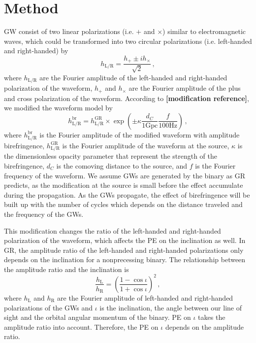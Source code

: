 \documentclass[reprint,amsmath,amssymb,aps,twocolumn]{aastex631}
\begin{document}
\section{Method}
\label{sec:Method}
GW consist of two linear polarizations (i.e. $+$ and $\times$) similar to electromagnetic waves, which could be transformed into two circular polarizations (i.e. left-handed and right-handed) by
\begin{equation}
    h_{\mathrm{L/R}} = \frac{h_+ \pm i h_\times}{\sqrt{2}}\,,
\end{equation}
where $h_{\mathrm{L/R}}$ are the Fourier amplitude of the left-handed and right-handed polarization of the waveform, $h_+$ and $h_\times$ are the Fourier amplitude of the plus and cross polarization of the waveform.
According to \textbf{[modification reference]}, we modified the waveform model by
\begin{equation}
    h_\mathrm{L/R}^{\mathrm{br}}=
    h_\mathrm{L/R}^{\mathrm{GR}}\times
    \exp\left(\pm\kappa\frac{d_C}{1\mathrm{Gpc}}\frac{f}{100\mathrm{Hz}}\right)\,,
\end{equation}
where $h_\mathrm{L/R}^{\mathrm{br}}$ is the Fourier amplitude of the modified waveform with amplitude birefringence, $h_\mathrm{L/R}^{\mathrm{GR}}$ is the Fourier amplitude of the waveform at the source, $\kappa$ is the dimensionless opacity parameter that represent the strength of the birefringence, $d_C$ is the comoving distance to the source, and $f$ is the Fourier frequency of the waveform.
We assume GWs are generated by the binary as GR predicts, as the modification at the source is small before the effect accumulate during the propagation.
As the GWs propagate, the effect of birefringence will be built up with the number of cycles which depends on the distance traveled and the frequency of the GWs.

This modification changes the ratio of the left-handed and right-handed polarization of the waveform, which affects the PE on the inclination as well.
In GR, the amplitude ratio of the left-handed and right-handed polarizations only depends on the inclination for a nonprecessing binary.
The relationship between the amplitude ratio and the inclination is
\begin{equation}
    \frac{h_\mathrm{L}}{h_\mathrm{R}}=\left(\frac{1-\cos\iota}{1+\cos\iota}\right)^2\,,
\end{equation}
where $h_\mathrm{L}$ and $h_\mathrm{R}$ are the Fourier amplitude of left-handed and right-handed polarizations of the GWs and $\iota$ is the inclination, the angle between our line of sight and the orbital angular momentum of the binary.
PE on $\iota$ takes the amplitude ratio into account. Therefore, the PE on $\iota$ depends on the amplitude ratio.
\end{document}
